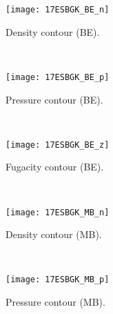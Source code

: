 \documentclass{rsproca}%
\begin{document}
\begin{figure}
        \centering
        \begin{subfigure}[b]{0.32\textwidth}
                \centering
                \texttt{[image: 17ESBGK\_BE\_n]}
                \caption{Density contour (BE).}
                \label{fig:17ESBGK_BE_n}
        \end{subfigure}%
        ~ %
        \begin{subfigure}[b]{0.32\textwidth}
                \centering
                \texttt{[image: 17ESBGK\_BE\_p]}
                \caption{Pressure contour (BE).}
                \label{fig:17ESBGK_BE_p}
        \end{subfigure}
        ~ %
        \begin{subfigure}[b]{0.32\textwidth}
                \centering
                \texttt{[image: 17ESBGK\_BE\_z]}
                \caption{Fugacity contour (BE).}
                \label{fig:17ESBGK_BE_z}
        \end{subfigure}
				~ %
        \begin{subfigure}[b]{0.32\textwidth}
                \centering
                \texttt{[image: 17ESBGK\_MB\_n]}
                \caption{Density contour (MB).}
                \label{fig:17ESBGK_MB_n}
        \end{subfigure}
        ~ %
        \begin{subfigure}[b]{0.32\textwidth}
                \centering
                \texttt{[image: 17ESBGK\_MB\_p]}
                \caption{Pressure contour (MB).}
                \label{fig:17ESBGK_MB_p}
        \end{subfigure}
				~ %
        \begin{subfigure}[b]{0.32\textwidth}

\end{subfigure}
\end{figure}
\end{document}
